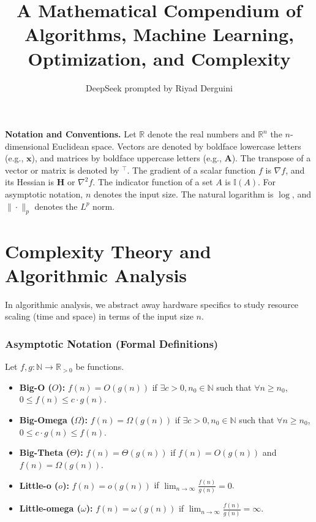 \documentclass[11pt]{article}
\title{A Mathematical Compendium of Algorithms, Machine Learning, Optimization, and Complexity}
\author{DeepSeek prompted by Riyad Derguini}
\date{}
\begin{document}
\maketitle

\textbf{Notation and Conventions.} Let \(\mathbb{R}\) denote the real numbers and \(\mathbb{R}^n\) the \(n\)-dimensional Euclidean space. Vectors are denoted by boldface lowercase letters (e.g., \(\mathbf{x}\)), and matrices by boldface uppercase letters (e.g., \(\mathbf{A}\)). The transpose of a vector or matrix is denoted by \(^\top\). The gradient of a scalar function \(f\) is \(\nabla f\), and its Hessian is \(\mathbf{H}\) or \(\nabla^2 f\). The indicator function of a set \(A\) is \(\mathbb{I}(A)\). For asymptotic notation, \(n\) denotes the input size. The natural logarithm is \(\log\), and \(\|\cdot\|_p\) denotes the \(L^p\) norm.

\hrulefill

\part{Complexity Theory and Algorithmic Analysis}

In algorithmic analysis, we abstract away hardware specifics to study resource scaling (time and space) in terms of the input size \(n\).

\section{Asymptotic Notation (Formal Definitions)}
Let \(f, g: \mathbb{N} \to \mathbb{R}_{>0}\) be functions.
\begin{itemize}
    \item \textbf{Big-O (\(O\)):} \(f(n) = O(g(n))\) if \(\exists c > 0, n_0 \in \mathbb{N}\) such that \(\forall n \ge n_0\), \(0 \le f(n) \le c \cdot g(n)\).
    \item \textbf{Big-Omega (\(\Omega\)):} \(f(n) = \Omega(g(n))\) if \(\exists c > 0, n_0 \in \mathbb{N}\) such that \(\forall n \ge n_0\), \(0 \le c \cdot g(n) \le f(n)\).
    \item \textbf{Big-Theta (\(\Theta\)):} \(f(n) = \Theta(g(n))\) if \(f(n) = O(g(n))\) and \(f(n) = \Omega(g(n))\).
    \item \textbf{Little-o (\(o\)):} \(f(n) = o(g(n))\) if \(\lim_{n \to \infty} \frac{f(n)}{g(n)} = 0\).
    \item \textbf{Little-omega (\(\omega\)):} \(f(n) = \omega(g(n))\) if \(\lim_{n \to \infty} \frac{f(n)}{g(n)} = \infty\).
\end{itemize}
\end{document}
